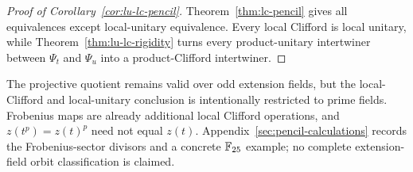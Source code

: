 \begin{proof}[Proof of Corollary~\ref{cor:lu-lc-pencil}]
Theorem~\ref{thm:lc-pencil} gives all equivalences except local-unitary
equivalence.  Every local Clifford is local unitary, while
Theorem~\ref{thm:lu-lc-rigidity} turns every product-unitary intertwiner
between \(\Psi_t\) and \(\Psi_u\) into a product-Clifford intertwiner.
\end{proof}

The projective quotient remains valid over odd extension fields, but the
local-Clifford and local-unitary conclusion is intentionally restricted to
prime fields.  Frobenius maps are already additional local Clifford
operations, and \(z(t^p)=z(t)^p\) need not equal \(z(t)\).
Appendix~\ref{sec:pencil-calculations} records the Frobenius-sector divisors
and a concrete \(\mathbb F_{25}\) example; no complete extension-field orbit
classification is claimed.
